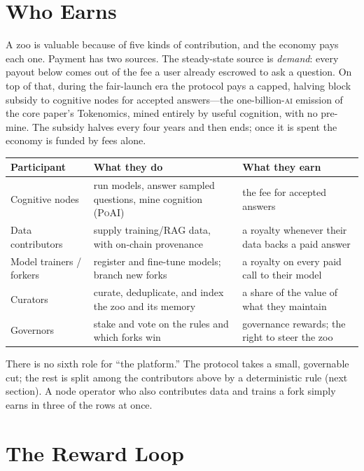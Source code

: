 \documentclass[11pt]{article}
\newcommand{\PoAI}{\textsc{PoAI}}
\begin{document}
\section{Who Earns}

A zoo is valuable because of five kinds of contribution, and the economy pays each one. Payment has two sources. The steady-state source is \emph{demand}: every payout below comes out of the fee a user already escrowed to ask a question. On top of that, during the fair-launch era the protocol pays a capped, halving block subsidy to cognitive nodes for accepted answers---the one-billion-\textsc{ai} emission of the core paper's Tokenomics, mined entirely by useful cognition, with no pre-mine. The subsidy halves every four years and then ends; once it is spent the economy is funded by fees alone.

\begin{table}[h]
\centering
\small
\begin{tabular}{@{}p{3.2cm}p{5.0cm}p{4.6cm}@{}}
\toprule
Participant & What they do & What they earn \\
\midrule
Cognitive nodes & run models, answer sampled questions, mine cognition (\PoAI{}) & the fee for accepted answers \\
Data contributors & supply training/RAG data, with on-chain provenance & a royalty whenever their data backs a paid answer \\
Model trainers / forkers & register and fine-tune models; branch new forks & a royalty on every paid call to their model \\
Curators & curate, deduplicate, and index the zoo and its memory & a share of the value of what they maintain \\
Governors & stake and vote on the rules and which forks win & governance rewards; the right to steer the zoo \\
\bottomrule
\end{tabular}
\end{table}

There is no sixth role for ``the platform.'' The protocol takes a small, governable cut; the rest is split among the contributors above by a deterministic rule (next section). A node operator who also contributes data and trains a fork simply earns in three of the rows at once.

\section{The Reward Loop}
\end{document}
